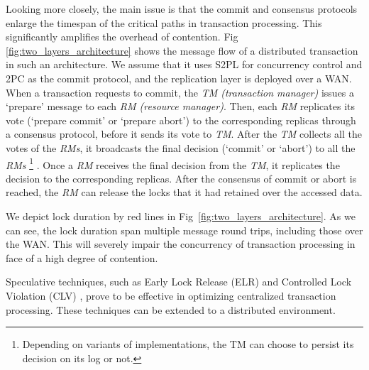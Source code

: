\documentclass[conference]{IEEEtran}
\begin{document}
Looking more closely, the main issue is that the commit and consensus protocols enlarge the timespan of the critical paths in transaction processing.
This significantly amplifies the overhead of contention.
Fig \ref{fig:two_layers_architecture} shows the message flow of a distributed transaction in such an architecture. We assume that
it uses S2PL for concurrency control and 2PC as the commit protocol, and the replication layer is deployed over a WAN.
When a transaction requests to commit, the \emph{TM (transaction manager)} issues a `prepare' message to each \emph{RM (resource manager)}.
Then, each \emph{RM} replicates its vote (`prepare commit' or `prepare abort') to the corresponding replicas through a consensus protocol, before it
sends its vote to \emph{TM}.
After the \emph{TM} collects all the votes of the \emph{RMs},
it broadcasts the final decision (`commit' or `abort') to all the \emph{RMs}
\footnote{Depending on variants of implementations, the TM can choose to persist its decision on its log or not.}
.
Once a \emph{RM} receives the final decision from the \emph{TM}, it replicates the decision to the corresponding replicas.
After the consensus of commit or abort is reached, the \emph{RM}
can release the locks that it had retained over the accessed data.

We depict lock duration by red lines in Fig~\ref{fig:two_layers_architecture}.
As we can see, the lock duration span multiple message round trips, including those over the WAN.
This will severely impair the concurrency of transaction processing in face of a high degree of contention.

Speculative techniques, such as Early Lock Release (ELR) \cite{EfficientLocking:conf/vldb/KimuraGK12} and Controlled Lock Violation (CLV)
\cite{CLV:conf/sigmod/GraefeLKTV13}, prove to be effective in optimizing centralized transaction processing.
These techniques can be extended to a distributed environment.
\end{document}

